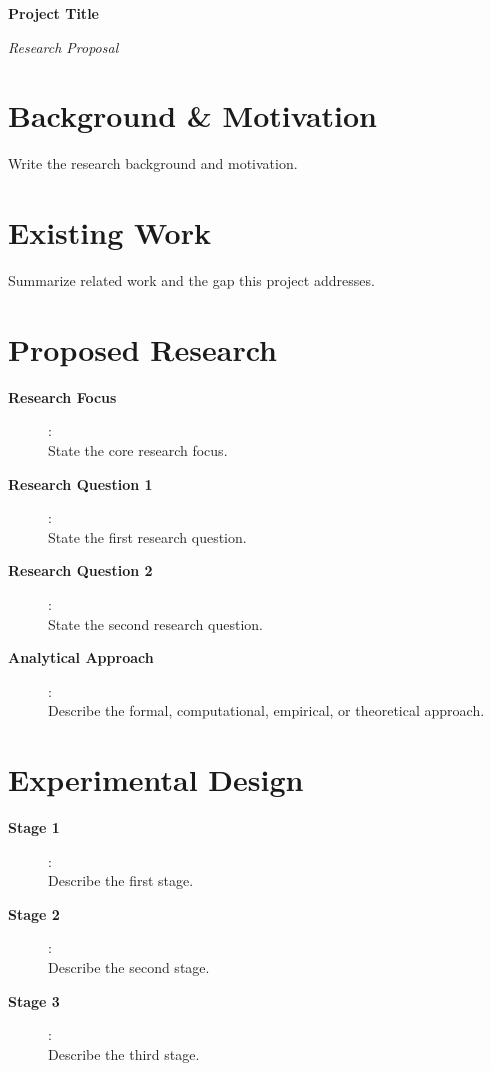 \documentclass[11pt]{article}
\begin{document}
	
	\begin{center}
		{\Large \textbf{Project Title}} \\
		
		\vspace{0.4em}
		
		{\large \textit{Research Proposal}}
	\end{center}
	
	\section*{Background \& Motivation}
	
	\noindent
	Write the research background and motivation.
	
	\section*{Existing Work}
	
	\noindent
	Summarize related work and the gap this project addresses.
	
	\section*{Proposed Research}
	
	\begin{description}
		\item[\textbf{Research Focus}]: \\
		State the core research focus.
		
		\item[\textbf{Research Question 1}]: \\
		State the first research question.
		
		\item[\textbf{Research Question 2}]: \\
		State the second research question.
		
		\item[\textbf{Analytical Approach}]: \\
		Describe the formal, computational, empirical, or theoretical approach.
	\end{description}
	
	\section*{Experimental Design}
	
	\begin{description}
		\item[\textbf{Stage 1}]: \\
		Describe the first stage.
		
		\item[\textbf{Stage 2}]: \\
		Describe the second stage.
		
		\item[\textbf{Stage 3}]: \\
		Describe the third stage.
	\end{description}
	
\end{document}
